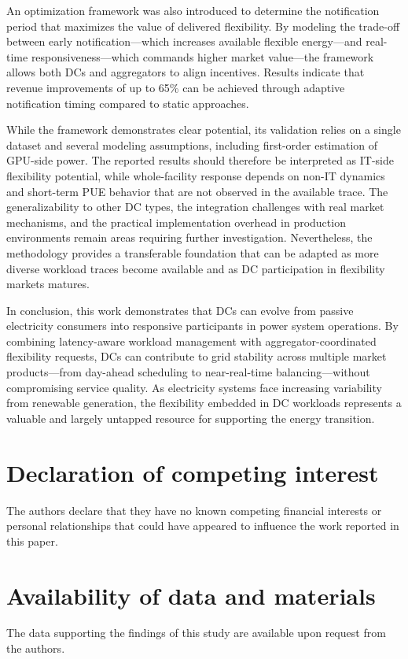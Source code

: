 \documentclass[preprint,12pt]{elsarticle}
\begin{document}
An optimization framework was also introduced to determine the notification period that maximizes the value of delivered flexibility. By modeling the trade-off between early notification—which increases available flexible energy—and real-time responsiveness—which commands higher market value—the framework allows both DCs and aggregators to align incentives. Results indicate that revenue improvements of up to 65\% can be achieved through adaptive notification timing compared to static approaches.

While the framework demonstrates clear potential, its validation relies on a single dataset and several modeling assumptions, including first-order estimation of GPU-side power. The reported results should therefore be interpreted as IT-side flexibility potential, while whole-facility response depends on non-IT dynamics and short-term PUE behavior that are not observed in the available trace. The generalizability to other DC types, the integration challenges with real market mechanisms, and the practical implementation overhead in production environments remain areas requiring further investigation. Nevertheless, the methodology provides a transferable foundation that can be adapted as more diverse workload traces become available and as DC participation in flexibility markets matures.

In conclusion, this work demonstrates that DCs can evolve from passive electricity consumers into responsive participants in power system operations. By combining latency-aware workload management with aggregator-coordinated flexibility requests, DCs can contribute to grid stability across multiple market products—from day-ahead scheduling to near-real-time balancing—without compromising service quality. As electricity systems face increasing variability from renewable generation, the flexibility embedded in DC workloads represents a valuable and largely untapped resource for supporting the energy transition.


\section*{Declaration of competing interest}
The authors declare that they have no known competing financial interests or personal relationships that could have appeared to influence the work reported in this paper.

\section*{Availability of data and materials}
The data supporting the findings of this study are available upon request from the authors.
\end{document}
